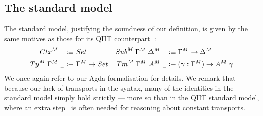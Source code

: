 \documentclass[a4paper,UKenglish,numberwithinsect,cleveref,thm-restate]{lipics-v2021}
\begin{document}
\subsection{The standard model} \label{subsec:std-model}
The standard model, justifying the soundness of our definition, is given by the same motives as those for its QIIT counterpart~\cite[Section~4]{Altenkirch2016a}:
\begin{align*}
  \Ctx^M\;\nameless          & \defeq \Set              & \Sub^M\;\Gamma^M\;\Delta^M\;\nameless & \defeq \Gamma^M \to \Delta^M \\
  \Ty^M\;\Gamma^M\;\nameless & \defeq \Gamma^M \to \Set & \Tm^M\;\Gamma^M\;A^M\;\nameless & \defeq (\gamma : \Gamma^M) \to A^M\;\gamma
\end{align*}
%
We once again refer to our Agda formalisation for details.
We remark that because our lack of transports in the syntax, many of the identities in the standard model simply hold strictly --- more so than in the QIIT standard model, where an extra step~\cite[Lemma~2.3.5]{UFP2013} is often needed for reasoning about constant transports.
\end{document}
